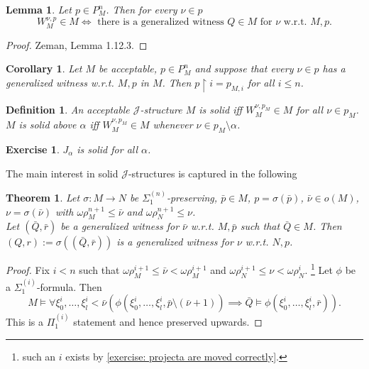 \documentclass[12pt,a4paper]{article}
\theoremstyle{nicestyle}
\newtheorem{theorem}{Theorem}[subsection]
\newtheorem{exercise}{Exercise}[subsection]
\newtheorem{definition}{Definition}[subsection]
\newtheorem{lemma}{Lemma}[subsection]
\newtheorem{corollary}{Corollary}[subsection]
\begin{document}
      \begin{lemma}
        Let $p \in P^{n}_{M}$. Then for every $\nu \in p$
        \[
          W^{\nu,p}_{M} \in M \iff \text{ there is a generalized
            witness } Q \in M \text{ for } \nu \text{ w.r.t. } M,p.
        \]
      \end{lemma}

      \begin{proof}
        Zeman, Lemma 1.12.3.
      \end{proof}

      \begin{corollary}
        Let $M$ be acceptable, $p \in P^{n}_{M}$ and suppose that
        every $\nu \in p$ has a generalized witness w.r.t. $M,p$ in
        $M$. Then $p \restriction i = p_{M,i}$ for all $i \le n$.
      \end{corollary}

      \begin{definition}
        An acceptable $\mathcal{J}$-structure $M$ is \emph{solid} iff
        $W^{\nu, p_{M}}_{M} \in M$ for all $\nu \in p_{M}$. \\
        $M$ is \emph{solid above $\alpha$} iff
        $W^{\nu, p_{M}}_{M} \in M$ whenever
        $\nu \in p_{M} \setminus \alpha$.
      \end{definition}

      \begin{exercise}
        $J_{\alpha}$ is solid for all $\alpha$.
      \end{exercise}

      The main interest in solid $\mathcal{J}$-structures is captured
      in the following

      \begin{theorem}
        Let $\sigma \colon M \to N$ be $\Sigma^{(n)}_{1}$-preserving,
        $\bar{p} \in M$, $p = \sigma(\bar{p})$, $\bar{\nu} \in o(M)$,
        $\nu = \sigma(\bar{\nu})$ with
        $\omega\rho^{n+1}_{M} \le \bar{\nu}$ and
        $\omega\rho^{n+1}_{N} \le \nu$. \\
        Let $(\bar{Q}, \bar{r})$ be a generalized witness for
        $\bar{\nu}$ w.r.t. $M, \bar{p}$ such that $\bar{Q} \in
        M$. Then $(Q,r) := \sigma((\bar{Q}, \bar{r}))$ is a
        generalized witness for $\nu$ w.r.t. $N,p$.
      \end{theorem}

      \begin{proof}
        Fix $i < n$ such that
        $\omega\rho^{i+1}_{M} \le \bar{\nu} < \omega\rho^{i+1}_{M}$
        and $\omega\rho^{i+1}_{N} \le \nu <
        \omega\rho^{i}_{N}$. \footnote{such an $i$ exists by
          \autoref{exercise: projecta are moved correctly}.} Let
        $\phi$ be a $\Sigma^{(i)}_{1}$-formula. Then
        \[
          M \models \forall \xi^{i}_{0}, \ldots, \xi^{i}_{l} <
          \bar{\nu} \left( \phi(\xi^{i}_{0}, \ldots, \xi^{i}_{l},
            \bar{p} \setminus (\bar{\nu} + 1)) \implies \bar{Q}
            \models \phi(\xi^{i}_{0}, \ldots,
            \xi^{i}_{l},\bar{r})\right).
        \]
        This is a $\Pi^{(i)}_{1}$ statement and hence preserved
        upwards.
      \end{proof}
\end{document}
